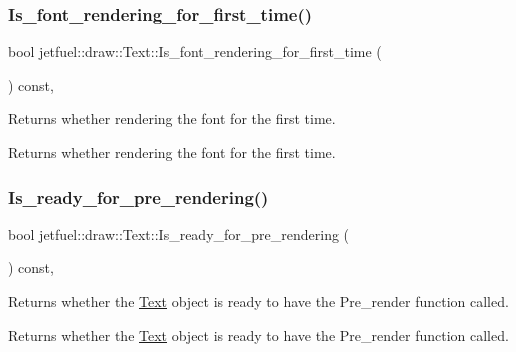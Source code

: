 \subsubsection{\texorpdfstring{Is\+\_\+font\+\_\+rendering\+\_\+for\+\_\+first\+\_\+time()}{Is\_font\_rendering\_for\_first\_time()}}
{\footnotesize\ttfamily bool jetfuel\+::draw\+::\+Text\+::\+Is\+\_\+font\+\_\+rendering\+\_\+for\+\_\+first\+\_\+time (\begin{DoxyParamCaption}{ }\end{DoxyParamCaption}) const\hspace{0.3cm}{\ttfamily [inline]}, {\ttfamily [protected]}}



Returns whether rendering the font for the first time. 

Returns whether rendering the font for the first time. \mbox{\label{classjetfuel_1_1draw_1_1Text_a3318092f2bf3d73b08c9e440b3e1e53c}} 
\subsubsection{\texorpdfstring{Is\+\_\+ready\+\_\+for\+\_\+pre\+\_\+rendering()}{Is\_ready\_for\_pre\_rendering()}}
{\footnotesize\ttfamily bool jetfuel\+::draw\+::\+Text\+::\+Is\+\_\+ready\+\_\+for\+\_\+pre\+\_\+rendering (\begin{DoxyParamCaption}{ }\end{DoxyParamCaption}) const\hspace{0.3cm}{\ttfamily [inline]}, {\ttfamily [protected]}}



Returns whether the \hyperlink{classjetfuel_1_1draw_1_1Text}{Text} object is ready to have the Pre\+\_\+render function called. 

Returns whether the \hyperlink{classjetfuel_1_1draw_1_1Text}{Text} object is ready to have the Pre\+\_\+render function called. \mbox{\label{classjetfuel_1_1draw_1_1Text_a2626023a1aa6998147ea40670d0fab8d}} 
